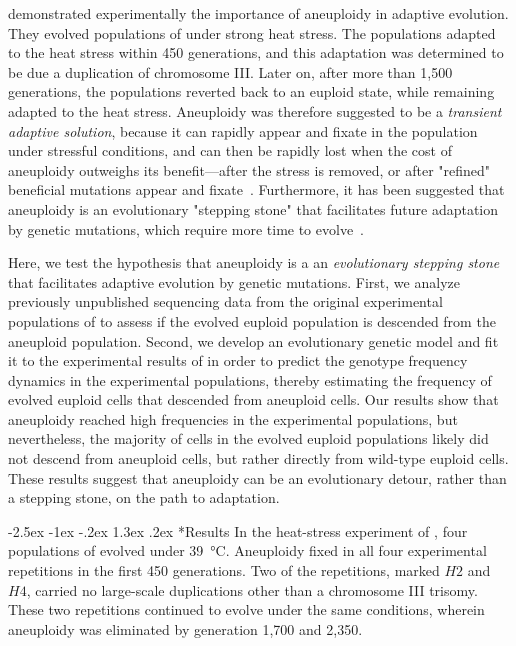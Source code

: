 \documentclass[12pt]{extarticle}
\makeatletter
\renewcommand\section{\@startsection {section}{1}{\z@}%
     {-2.5ex \@plus -1ex \@minus -.2ex}%
     {1.3ex \@plus.2ex}%
    {\Large\bfseries}}
\makeatother
\begin{document}
\citet{Yona2012} demonstrated experimentally the importance of aneuploidy in adaptive evolution. They evolved populations of \yeast under strong heat stress.
The populations adapted to the heat stress within 450 generations, and this adaptation was determined to be due a duplication of chromosome III.
Later on, after more than 1,500 generations, the populations reverted back to an euploid state, while remaining adapted to the heat stress. 
Aneuploidy was therefore suggested to be a \emph{transient adaptive solution}, because it can rapidly appear and fixate in the population under stressful conditions, and can then be rapidly lost when the cost of aneuploidy outweighs its benefit---after the stress is removed, or after "refined" beneficial mutations appear and fixate~\citep{Yona2012}.
Furthermore, it has been suggested that aneuploidy is an evolutionary "stepping stone" that facilitates future adaptation by genetic mutations, which require more time to evolve~\citep{Yona2012,Yona2015}.

Here, we test the hypothesis that aneuploidy is a an \emph{evolutionary stepping stone} that facilitates adaptive evolution by genetic mutations.
First, we analyze previously unpublished sequencing data from the original experimental populations of \citet{Yona2012} to assess if the evolved euploid population is descended from the aneuploid population.
Second, we develop an evolutionary genetic model and fit it to the experimental results of \citet{Yona2012} in order to predict the genotype frequency dynamics in the experimental populations, thereby estimating the frequency of evolved euploid cells that descended from aneuploid cells. 
Our results show that aneuploidy reached high frequencies in the experimental populations, but nevertheless, the majority of cells in the evolved euploid populations likely did not descend from aneuploid cells, but rather directly from wild-type euploid cells.
These results suggest that aneuploidy can be an evolutionary detour, rather than a stepping stone, on the path to adaptation.


\section*{Results}
In the heat-stress experiment of \citet{Yona2012}, four populations of \yeast evolved under \SI{39}{\celsius}.
Aneuploidy fixed in all four experimental repetitions in the first 450 generations.
Two of the repetitions, marked $H2$ and $H4$, carried no large-scale duplications other than a chromosome III trisomy.
These two repetitions continued to evolve under the same conditions, wherein aneuploidy was eliminated by generation 1,700 and 2,350.
\end{document}
